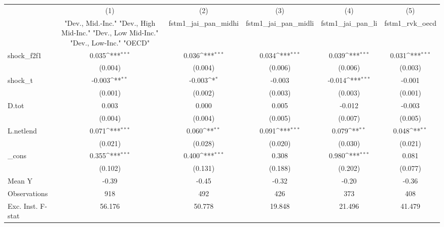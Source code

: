 {
\def\sym#1{\ifmmode^{#1}\else\(^{#1}\)\fi}
\begin{tabular}{l*{5}{c}}
\toprule
            &\multicolumn{1}{c}{(1)}&\multicolumn{1}{c}{(2)}&\multicolumn{1}{c}{(3)}&\multicolumn{1}{c}{(4)}&\multicolumn{1}{c}{(5)}\\
            &\multicolumn{1}{c}{ "Dev., Mid.-Inc." "Dev., High Mid-Inc." "Dev., Low Mid-Inc." "Dev., Low-Inc." "OECD" }&\multicolumn{1}{c}{fstm1\_jai\_pan\_midhi}&\multicolumn{1}{c}{fstm1\_jai\_pan\_midli}&\multicolumn{1}{c}{fstm1\_jai\_pan\_li}&\multicolumn{1}{c}{fstm1\_rvk\_oecd}\\
\midrule
shock\_f2f1  &       0.035\sym{***}&       0.036\sym{***}&       0.034\sym{***}&       0.039\sym{***}&       0.031\sym{***}\\
            &     (0.004)         &     (0.004)         &     (0.006)         &     (0.006)         &     (0.003)         \\
\addlinespace
shock\_t     &      -0.003\sym{**} &      -0.003\sym{*}  &      -0.003         &      -0.014\sym{***}&      -0.001         \\
            &     (0.001)         &     (0.002)         &     (0.003)         &     (0.003)         &     (0.001)         \\
\addlinespace
D.tot       &       0.003         &       0.000         &       0.005         &      -0.012         &      -0.003         \\
            &     (0.004)         &     (0.004)         &     (0.005)         &     (0.007)         &     (0.005)         \\
\addlinespace
L.netlend   &       0.071\sym{***}&       0.060\sym{**} &       0.091\sym{***}&       0.079\sym{**} &       0.048\sym{**} \\
            &     (0.021)         &     (0.028)         &     (0.020)         &     (0.030)         &     (0.021)         \\
\addlinespace
\_cons      &       0.355\sym{***}&       0.400\sym{***}&       0.308         &       0.980\sym{***}&       0.081         \\
            &     (0.102)         &     (0.131)         &     (0.188)         &     (0.202)         &     (0.077)         \\
\midrule
Mean Y      &       -0.39         &       -0.45         &       -0.32         &       -0.20         &       -0.36         \\
Observations&         918         &         492         &         426         &         373         &         408         \\
Exc. Inst. F-stat&      56.176         &      50.778         &      19.848         &      21.496         &      41.479         \\
\bottomrule
\end{tabular}
}
